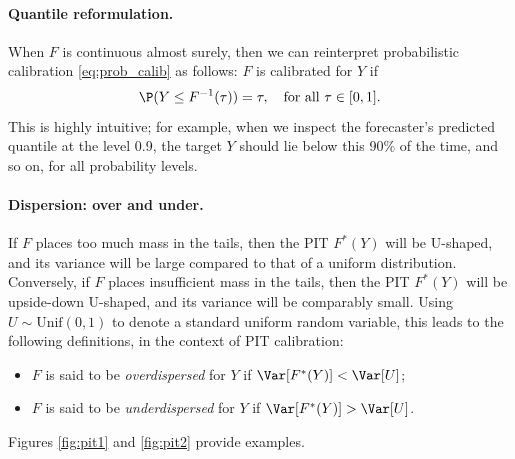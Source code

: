 \documentclass{article}
\begin{document}
\paragraph{Quantile reformulation.}

When $F$ is continuous almost surely, then we can reinterpret probabilistic
calibration \eqref{eq:prob_calib} as follows: $F$ is calibrated for $Y$ if  
\[
\P(Y \leq F^{-1}(\tau)) = \tau, \quad \text{for all $\tau \in [0,1]$}. 
\]
This is highly intuitive; for example, when we inspect the forecaster's
predicted quantile at the level 0.9, the target $Y$ should lie below this 90\% 
of the time, and so on, for all probability levels.   

\paragraph{Dispersion: over and under.}

If $F$ places too much mass in the tails, then the PIT $F^*(Y)$ will be
U-shaped, and its variance will be large compared to that of a uniform
distribution. Conversely, if $F$ places insufficient mass in the tails, then the 
PIT $F^*(Y)$ will be upside-down U-shaped, and its variance will be comparably
small. Using $U \sim \mathrm{Unif}(0,1)$ to denote a standard uniform random
variable, this leads to the following definitions, in the context of PIT
calibration:   

\begin{itemize}
\item $F$ is said to be \emph{overdispersed} for $Y$ if $\Var[F^*(Y)] < \Var[U]$;
\item $F$ is said to be \emph{underdispersed} for $Y$ if $\Var[F^*(Y)] >
  \Var[U]$. 
\end{itemize}

Figures \ref{fig:pit1} and \ref{fig:pit2} provide examples.
\end{document}
